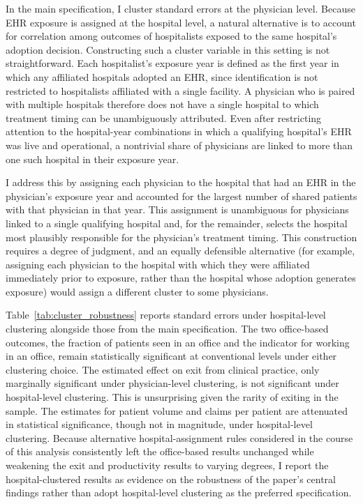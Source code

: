 \documentclass[12pt]{article}
\begin{document}
In the main specification, I cluster standard errors at the physician level. Because EHR exposure is assigned at the hospital level, a natural alternative is to account for correlation among outcomes of hospitalists exposed to the same hospital's adoption decision. Constructing such a cluster variable in this setting is not straightforward. Each hospitalist's exposure year is defined as the first year in which any affiliated hospitals adopted an EHR, since identification is not restricted to hospitalists affiliated with a single facility. A physician who is paired with multiple hospitals therefore does not have a single hospital to which treatment timing can be unambiguously attributed. Even after restricting attention to the hospital-year combinations in which a qualifying hospital's EHR was live and operational, a nontrivial share of physicians are linked to more than one such hospital in their exposure year.

I address this by assigning each physician to the hospital that had an EHR in the physician's exposure year and accounted for the largest number of shared patients with that physician in that year. This assignment is unambiguous for physicians linked to a single qualifying hospital and, for the remainder, selects the hospital most plausibly responsible for the physician's treatment timing. This construction requires a degree of judgment, and an equally defensible alternative (for example, assigning each physician to the hospital with which they were affiliated immediately prior to exposure, rather than the hospital whose adoption generates exposure) would assign a different cluster to some physicians.

Table~\ref{tab:cluster_robustness} reports standard errors under hospital-level clustering alongside those from the main specification. The two office-based outcomes, the fraction of patients seen in an office and the indicator for working in an office, remain statistically significant at conventional levels under either clustering choice. The estimated effect on exit from clinical practice, only marginally significant under physician-level clustering, is not significant under hospital-level clustering. This is unsurprising given the rarity of exiting in the sample. The estimates for patient volume and claims per patient are attenuated in statistical significance, though not in magnitude, under hospital-level clustering. Because alternative hospital-assignment rules considered in the course of this analysis consistently left the office-based results unchanged while weakening the exit and productivity results to varying degrees, I report the hospital-clustered results as evidence on the robustness of the paper's central findings rather than adopt hospital-level clustering as the preferred specification.
\end{document}

